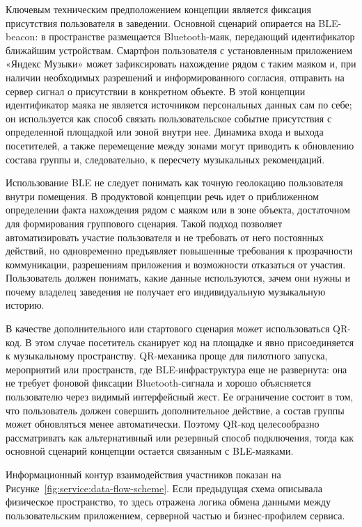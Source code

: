 Ключевым техническим предположением концепции является фиксация присутствия пользователя в заведении. Основной сценарий опирается на BLE-beacon: в пространстве размещается Bluetooth-маяк, передающий идентификатор ближайшим устройствам. Смартфон пользователя с установленным приложением «Яндекс Музыки» может зафиксировать нахождение рядом с таким маяком и, при наличии необходимых разрешений и информированного согласия, отправить на сервер сигнал о присутствии в конкретном объекте. В этой концепции идентификатор маяка не является источником персональных данных сам по себе; он используется как способ связать пользовательское событие присутствия с определенной площадкой или зоной внутри нее. Динамика входа и выхода посетителей, а также перемещение между зонами могут приводить к обновлению состава группы и, следовательно, к пересчету музыкальных рекомендаций.

Использование BLE не следует понимать как точную геолокацию пользователя внутри помещения. В продуктовой концепции речь идет о приближенном определении факта нахождения рядом с маяком или в зоне объекта, достаточном для формирования группового сценария. Такой подход позволяет автоматизировать участие пользователя и не требовать от него постоянных действий, но одновременно предъявляет повышенные требования к прозрачности коммуникации, разрешениям приложения и возможности отказаться от участия. Пользователь должен понимать, какие данные используются, зачем они нужны и почему владелец заведения не получает его индивидуальную музыкальную историю.

В качестве дополнительного или стартового сценария может использоваться QR-код. В этом случае посетитель сканирует код на площадке и явно присоединяется к музыкальному пространству. QR-механика проще для пилотного запуска, мероприятий или пространств, где BLE-инфраструктура еще не развернута: она не требует фоновой фиксации Bluetooth-сигнала и хорошо объясняется пользователю через видимый интерфейсный жест. Ее ограничение состоит в том, что пользователь должен совершить дополнительное действие, а состав группы может обновляться менее автоматически. Поэтому QR-код целесообразно рассматривать как альтернативный или резервный способ подключения, тогда как основной сценарий концепции остается связанным с BLE-маяками.

Информационный контур взаимодействия участников показан на Рисунке~\ref{fig:service:data-flow-scheme}. Если предыдущая схема описывала физическое пространство, то здесь отражена логика обмена данными между пользовательским приложением, серверной частью и бизнес-профилем сервиса.

